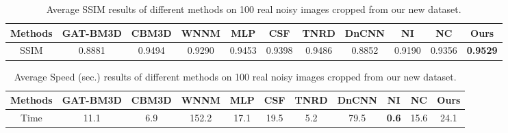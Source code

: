 \begin{table}[htpb]
\begin{adjustwidth}{-1cm}{}
\scriptsize
\caption{Average SSIM \cite{ssim} results of different methods on 100 real noisy images cropped from our new dataset.}
\label{tab3-7}
\begin{center}
\renewcommand\arraystretch{1}
\begin{tabular}{|c||c|c|c|c|c|c|c|c|c|c|}
\hline
Methods
&\textbf{GAT-BM3D}
&\textbf{CBM3D}
&\textbf{WNNM}
&\textbf{MLP}
&\textbf{CSF} 
&\textbf{TNRD} 
&\textbf{DnCNN}
&\textbf{NI} 
&\textbf{NC} 
&\textbf{Ours} 
\\
\hline
SSIM  
& 0.8881 & 0.9494 & 0.9290 & 0.9453 & 0.9398 & 0.9486 & 0.8852 & 0.9190 & 0.9356 & \textbf{0.9529}
\\
\hline
\end{tabular}
\end{center}
\end{adjustwidth}
\end{table}



\begin{table}\vspace{-4mm}
\begin{adjustwidth}{-1cm}{}
\scriptsize
\caption{Average Speed (sec.) results of different methods on 100 real noisy images cropped from our new dataset.}
\vspace{-4mm}
\label{tab3-8}
\begin{center}
\renewcommand\arraystretch{1}
\begin{tabular}{|c||c|c|c|c|c|c|c|c|c|c|}
\hline
Methods
&\textbf{GAT-BM3D}
&\textbf{CBM3D}
&\textbf{WNNM}
&\textbf{MLP}
&\textbf{CSF} 
&\textbf{TNRD} 
&\textbf{DnCNN}
&\textbf{NI} 
&\textbf{NC} 
&\textbf{Ours} 
\\
\hline
Time  
& 11.1 & 6.9 & 152.2 & 17.1 & 19.5 & 5.2 & 79.5 & \textbf{0.6} & 15.6 & 24.1
\\
\hline
\end{tabular}
\end{center}
\end{adjustwidth}
\end{table}


